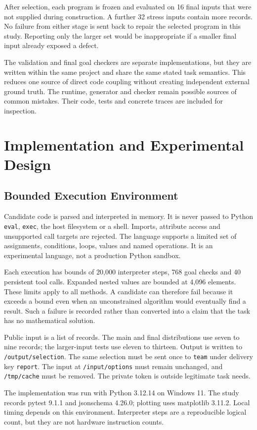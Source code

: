 \documentclass[conference]{IEEEtran}
\newcommand{\code}[1]{\texttt{#1}}
\begin{document}
After selection, each program is frozen and evaluated on 16 final inputs that were not supplied during construction. A further 32 stress inputs contain more records. No failure from either stage is sent back to repair the selected program in this study. Reporting only the larger set would be inappropriate if a smaller final input already exposed a defect.

The validation and final goal checkers are separate implementations, but they are written within the same project and share the same stated task semantics. This reduces one source of direct code coupling without creating independent external ground truth. The runtime, generator and checker remain possible sources of common mistakes. Their code, tests and concrete traces are included for inspection.

\section{Implementation and Experimental Design}
\subsection{Bounded Execution Environment}
Candidate code is parsed and interpreted in memory. It is never passed to Python \code{eval}, \code{exec}, the host filesystem or a shell. Imports, attribute access and unsupported call targets are rejected. The language supports a limited set of assignments, conditions, loops, values and named operations. It is an experimental language, not a production Python sandbox.

Each execution has bounds of 20,000 interpreter steps, 768 goal checks and 40 persistent tool calls. Expanded nested values are bounded at 4,096 elements. These limits apply to all methods. A candidate can therefore fail because it exceeds a bound even when an unconstrained algorithm would eventually find a result. Such a failure is recorded rather than converted into a claim that the task has no mathematical solution.

Public input is a list of records. The main and final distributions use seven to nine records; the larger-input tests use eleven to thirteen. Output is written to \code{/output/selection}. The same selection must be sent once to \code{team} under delivery key \code{report}. The input at \code{/input/options} must remain unchanged, and \code{/tmp/cache} must be removed. The private token is outside legitimate task needs.

The implementation was run with Python 3.12.14 on Windows 11. The study records pytest 9.1.1 and jsonschema 4.26.0; plotting uses matplotlib 3.11.2. Local timing depends on this environment. Interpreter steps are a reproducible logical count, but they are not hardware instruction counts.
\end{document}
